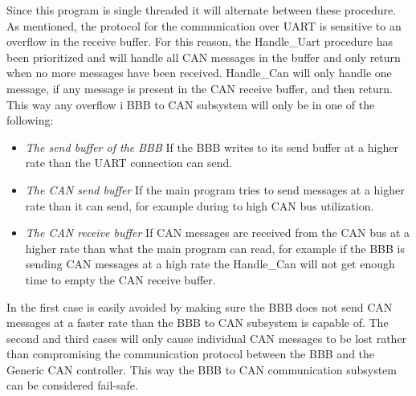 Since this program is single threaded it will alternate between these procedure. \newline 
As mentioned, the protocol for the communication over UART is sensitive to an overflow in the receive buffer. For this reason, the Handle\_Uart procedure has been prioritized and will handle all CAN messages in the buffer and only return when no more messages have been received. Handle\_Can will only handle one message, if any message is present in the CAN receive buffer, and then return. \newline
This way any overflow i BBB to CAN subsystem will only be in one of the following:

\begin{itemize}
   \item { \em The send buffer of the BBB} \newline
   If the BBB writes to its send buffer at a higher rate than the UART connection can send.
   \item { \em The CAN send buffer} \newline
   If the main program tries to send messages at a higher rate than it can send, for example during to high CAN bus utilization.
   \item { \em The CAN receive buffer} \newline
   If CAN messages are received from the CAN bus at a higher rate than what the main program can read, for example if the BBB is sending CAN messages at a high rate the Handle\_Can will not get enough time to empty the CAN receive buffer.
\end{itemize}

In the first case is easily avoided by making sure the BBB does not send CAN messages at a faster rate than the BBB to CAN subsystem is capable of. The second and third cases will only cause individual CAN messages to be lost rather than compromising the communication protocol between the BBB and the Generic CAN controller. \newline
This way the BBB to CAN communication subsystem can be considered fail-safe.